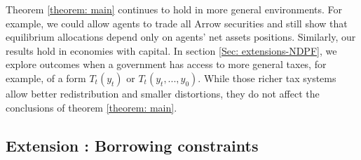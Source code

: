\documentclass[thmsb,11pt]{article}
\begin{document}
Theorem \ref{theorem: main} continues to hold in more general environments. For example, we could allow
agents to trade all  Arrow securities and still show that  equilibrium
allocations depend only on agents' net assets positions.
Similarly, our results   hold in  economies with capital.
In section \ref{Sec: extensions-NDPF},  we explore outcomes when a government has
access to more general taxes, for example, of a form $T_{t}(y_{t})$ or $%
T_{t}(y_{t},...,y_{0})$. While those richer  tax systems  allow better redistribution and
smaller distortions, they do not affect  the conclusions of theorem \ref{theorem: main}.

\subsection{Extension : Borrowing constraints\label{Sec: extensions}}
%
\end{document}
